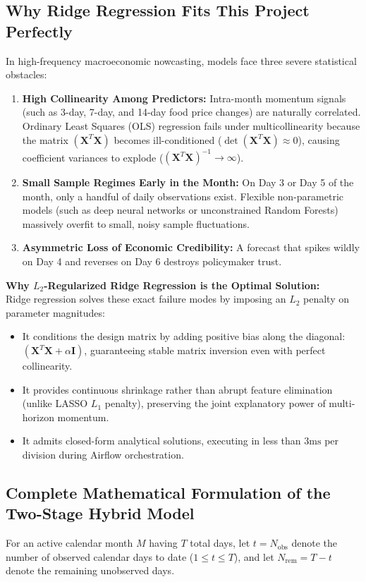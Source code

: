 \documentclass[11pt,a4paper,oneside]{article}
\begin{document}
\subsection{Why Ridge Regression Fits This Project Perfectly}
In high-frequency macroeconomic nowcasting, models face three severe statistical obstacles:
\begin{enumerate}
    \item \textbf{High Collinearity Among Predictors:} Intra-month momentum signals (such as 3-day, 7-day, and 14-day food price changes) are naturally correlated. Ordinary Least Squares (OLS) regression fails under multicollinearity because the matrix $(\mathbf{X}^T \mathbf{X})$ becomes ill-conditioned ($\det(\mathbf{X}^T \mathbf{X}) \approx 0$), causing coefficient variances to explode ($(\mathbf{X}^T \mathbf{X})^{-1} \to \infty$).
    \item \textbf{Small Sample Regimes Early in the Month:} On Day 3 or Day 5 of the month, only a handful of daily observations exist. Flexible non-parametric models (such as deep neural networks or unconstrained Random Forests) massively overfit to small, noisy sample fluctuations.
    \item \textbf{Asymmetric Loss of Economic Credibility:} A forecast that spikes wildly on Day 4 and reverses on Day 6 destroys policymaker trust.
\end{enumerate}

\textbf{Why $L_2$-Regularized Ridge Regression is the Optimal Solution:}\\
Ridge regression solves these exact failure modes by imposing an $L_2$ penalty on parameter magnitudes:
\begin{itemize}[noitemsep]
    \item It conditions the design matrix by adding positive bias along the diagonal: $(\mathbf{X}^T \mathbf{X} + \alpha \mathbf{I})$, guaranteeing stable matrix inversion even with perfect collinearity.
    \item It provides continuous shrinkage rather than abrupt feature elimination (unlike LASSO $L_1$ penalty), preserving the joint explanatory power of multi-horizon momentum.
    \item It admits closed-form analytical solutions, executing in less than $3\text{ms}$ per division during Airflow orchestration.
\end{itemize}

\subsection{Complete Mathematical Formulation of the Two-Stage Hybrid Model}
For an active calendar month $M$ having $T$ total days, let $t = N_{\text{obs}}$ denote the number of observed calendar days to date ($1 \le t \le T$), and let $N_{\text{rem}} = T - t$ denote the remaining unobserved days.
\end{document}
